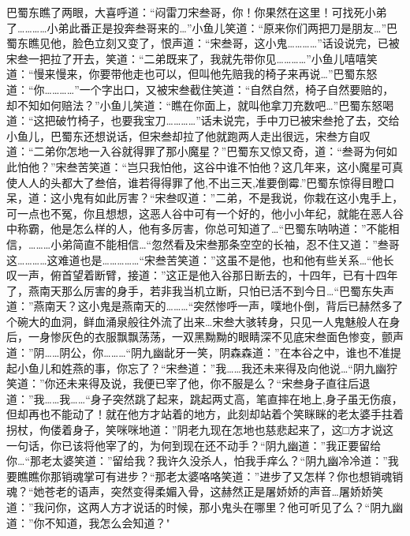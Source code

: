 \documentclass[12pt,oneside]{book}
\begin{document}
巴蜀东瞧了两眼，大喜呼道：``闷雷刀宋叁哥，你！你果然在这里！可找死小弟了\ldots\ldots\ldots\ldots 小弟此番正是投奔叁哥来的\ldots{}''小鱼儿笑道：``原来你们两把刀是朋友\ldots{}''巴蜀东瞧见他，脸色立刻又变了，恨声道：``宋叁哥，这小鬼\ldots\ldots\ldots\ldots{}''话设说完，已被宋叁一把拉了开去，笑道：``二弟既来了，我就先带你见\ldots\ldots\ldots\ldots{}''小鱼儿嘻嘻笑道：``慢来慢来，你要带他走也可以，但叫他先赔我的椅子来再说\ldots{}''巴蜀东怒道：``你\ldots\ldots\ldots\ldots{}''一个字出口，又被宋叁截住笑道：``自然自然，椅子自然要赔的，却不知如何赔法？''小鱼儿笑道：``瞧在你面上，就叫他拿刀充数吧\ldots{}''巴蜀东怒喝道：``这把破竹椅子，也要我宝刀\ldots\ldots\ldots\ldots{}''话未说完，手中刀已被宋叁抢了去，交给小鱼儿，巴蜀东还想说话，但宋叁却拉了他就跑两人走出很远，宋叁方自叹道：``二弟你怎地一入谷就得罪了那小魔星？''巴蜀东又惊又奇，道：``叁哥为何如此怕他？''宋叁苦笑道：``岂只我怕他，这谷中谁不怕他？这几年来，这小魔星可真使人人的头都大了叁倍，谁若得得罪了他,不出三天,准要倒霉.''巴蜀东惊得目瞪口呆，道：这小鬼有如此厉害？``宋叁叹道：''二弟，不是我说，你栽在这小鬼手上，可一点也不冤，你且想想，这恶人谷中可有一个好的，他小小年纪，就能在恶人谷中称霸，他是怎么样的人，他有多厉害，你总可知道了\ldots{}``巴蜀东呐呐道：''不能相信，\ldots\ldots\ldots 小弟简直不能相信\ldots{}``忽然看及宋叁那条空空的长袖，忍不住又道：''叁哥这\ldots\ldots\ldots\ldots 这难道也是\ldots\ldots\ldots\ldots\ldots{}``宋叁苦笑道：''这虽不是他，也和他有些关系\ldots{}``他长叹一声，俯首望着断臂，接道：''这正是他入谷那日断去的，十四年，已有十四年了，燕南天那么厉害的身手，若非我当机立断，只怕已活不到今日\ldots{}``巴蜀东失声道：''燕南天？这小鬼是燕南天的\ldots\ldots\ldots{}``突然惨呼一声，噗地仆倒，背后已赫然多了个碗大的血洞，鲜血涌泉般往外流了出来\ldots 宋叁大骇转身，只见一人鬼魅般人在身后，一身惨灰色的衣服飘飘荡荡，一双黑黝黝的眼睛深不见底宋叁面色惨变，颤声道：''阴\ldots\ldots 阴公，你\ldots\ldots\ldots{}``阴九幽龀牙一笑，阴森森道：''在本谷之中，谁也不准提起小鱼儿和姓燕的事，你忘了？``宋叁道：''我\ldots\ldots 我还未来得及向他说\ldots{}``阴九幽狞笑道：''你还未来得及说，我便已宰了他，你不服是么？``宋叁身子直往后退道：''我\ldots\ldots 我\ldots\ldots{}``身子突然跳了起来，跳起两丈高，笔直摔在地上,身子虽无伤痕，但却再也不能动了！就在他方才站着的地方，此刻却站着个笑眯眯的老太婆手拄着拐杖，佝偻着身子，笑咪咪地道：''阴老九现在怎地也慈悲起来了，这□方才说这一句话，你已该将他宰了的，为何到现在还不动手？``阴九幽道：''我正要留给你\ldots{}``那老太婆笑道：''留给我？我许久没杀人，怕我手痒么？``阴九幽冷冷道：''我要瞧瞧你那销魂掌可有进步？``那老太婆咯咯笑道：''进步了又怎样？你也想销魂销魂？``她苍老的语声，突然变得柔媚入骨，这赫然正是屠娇娇的声音\ldots 屠娇娇笑道：''我问你，这两人方才说话的时候，那小鬼头在哪里？他可听见了么？``阴九幽道：''你不知道，我怎么会知道？"
\end{document}
